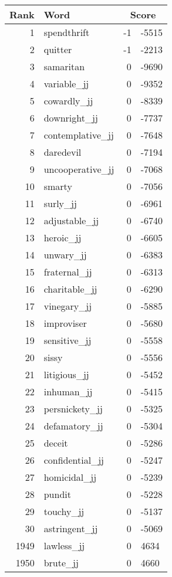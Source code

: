 \begin{longtable}[!htbp]{| rlr@{.}l |}
    \hline
    \textbf{Rank} & \textbf{Word} & \multicolumn{2}{c|}{\textbf{Score}} \\
    \hline
    \endhead
    1 & spendthrift & -1 & -5515 \\
    2 & quitter & -1 & -2213 \\
    3 & samaritan & 0 & -9690 \\
    4 & variable\_jj & 0 & -9352 \\
    5 & cowardly\_jj & 0 & -8339 \\
    6 & downright\_jj & 0 & -7737 \\
    7 & contemplative\_jj & 0 & -7648 \\
    8 & daredevil & 0 & -7194 \\
    9 & uncooperative\_jj & 0 & -7068 \\
    10 & smarty & 0 & -7056 \\
    11 & surly\_jj & 0 & -6961 \\
    12 & adjustable\_jj & 0 & -6740 \\
    13 & heroic\_jj & 0 & -6605 \\
    14 & unwary\_jj & 0 & -6383 \\
    15 & fraternal\_jj & 0 & -6313 \\
    16 & charitable\_jj & 0 & -6290 \\
    17 & vinegary\_jj & 0 & -5885 \\
    18 & improviser & 0 & -5680 \\
    19 & sensitive\_jj & 0 & -5558 \\
    20 & sissy & 0 & -5556 \\
    21 & litigious\_jj & 0 & -5452 \\
    22 & inhuman\_jj & 0 & -5415 \\
    23 & persnickety\_jj & 0 & -5325 \\
    24 & defamatory\_jj & 0 & -5304 \\
    25 & deceit & 0 & -5286 \\
    26 & confidential\_jj & 0 & -5247 \\
    27 & homicidal\_jj & 0 & -5239 \\
    28 & pundit & 0 & -5228 \\
    29 & touchy\_jj & 0 & -5137 \\
    30 & astringent\_jj & 0 & -5069 \\
    1949 & lawless\_jj & 0 & 4634 \\
    1950 & brute\_jj & 0 & 4660 \\

\end{longtable}
